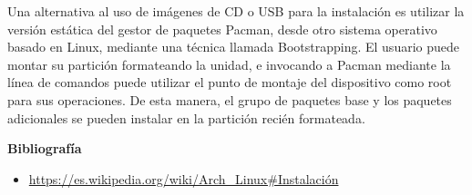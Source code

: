 \documentclass[11pt, a4paper]{report}
\begin{document}
Una alternativa al uso de imágenes de CD o USB para la instalación es utilizar
la versión estática del gestor de paquetes Pacman, desde otro sistema operativo
basado en Linux, mediante una técnica llamada Bootstrapping.​ El usuario
puede montar su partición formateando la unidad, e invocando a Pacman mediante
la línea de comandos puede utilizar el punto de montaje del dispositivo como
root para sus operaciones. De esta manera, el grupo de paquetes base y los
paquetes adicionales se pueden instalar en la partición recién formateada.


\newpage

\textbf{Bibliografía} \\

\begin{itemize}

\item \url{https://es.wikipedia.org/wiki/Arch_Linux#Instalación}


\end{itemize}
\end{document}
